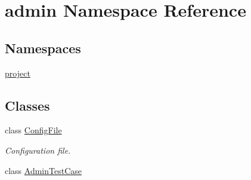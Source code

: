 \hypertarget{namespaceadmin}{\section{admin Namespace Reference}
\label{namespaceadmin}
}
\subsection*{Namespaces}
\begin{DoxyCompactItemize}
\item 
\hyperlink{namespaceadmin_1_1project}{project}
\end{DoxyCompactItemize}
\subsection*{Classes}
\begin{DoxyCompactItemize}
\item 
class \hyperlink{classadmin_1_1ConfigFile}{Config\-File}
\begin{DoxyCompactList}\small\item\em Configuration file. \end{DoxyCompactList}\item 
class \hyperlink{classadmin_1_1AdminTestCase}{Admin\-Test\-Case}
\end{DoxyCompactItemize}
